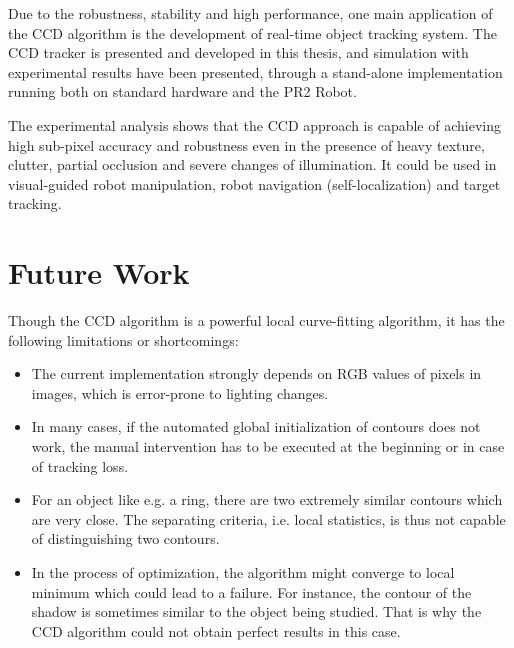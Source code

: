 Due to the robustness, stability and high performance, one main
application of the CCD algorithm is the development of real-time
object tracking system. The CCD tracker is presented and developed in
this thesis, and simulation with experimental results have been presented, through a
stand-alone implementation running both on
standard hardware and the PR2 Robot.


The experimental analysis shows that the CCD approach is capable of
achieving high sub-pixel accuracy and robustness even in the presence
of heavy texture, clutter, partial occlusion and severe changes of
illumination. It could be used in  visual-guided robot
manipulation, robot navigation (self-localization) and target
tracking.

\section{Future Work}
\label{sec:feature}

Though the CCD algorithm is a powerful local curve-fitting algorithm,
it has the following limitations or shortcomings:
\begin{itemize}
\item The current implementation strongly depends on RGB values of pixels in
  images, which is error-prone to lighting changes.%
\item In many cases, if the automated global initialization of contours does
  not work, the manual intervention has to be executed at the beginning or
  in case of tracking loss.
\item For an object like e.g. a ring, there are two extremely similar
  contours which are very close. The separating criteria, i.e. local
  statistics, is thus not capable of distinguishing two contours.
\item In the process of optimization, the algorithm might converge to
  local minimum which could lead to a failure. For instance, the
  contour of the shadow is sometimes similar to the object being
  studied. That is why the CCD algorithm could not obtain perfect results in this case.
\end{itemize}

